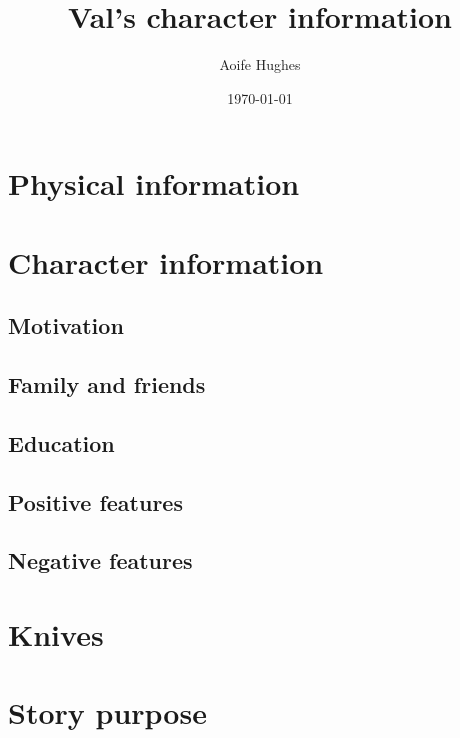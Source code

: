 \documentclass[11pt]{article}
\title{Val's character information}
\author{Aoife Hughes}
\date{\today}
\begin{document}
\maketitle	
\pagebreak


\section{Physical information}




\section{Character information}


\subsection{Motivation}

\subsection{Family and friends}

\subsection{Education}

\subsection{Positive features}

\subsection{Negative features}

\section{Knives}



\section{Story purpose}
\end{document}
